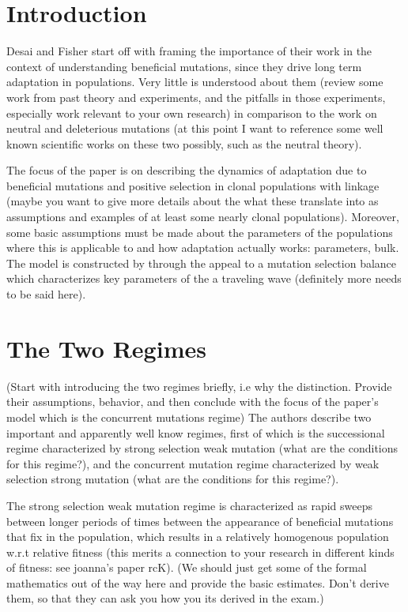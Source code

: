 \documentclass[12pt,twocolumn]{article}
\begin{document}

\newpage
\section{Introduction}
Desai and Fisher start off with framing the importance of their work in the context of understanding beneficial mutations, since they drive long term adaptation in populations.  Very little is understood about them (review some work from past theory and experiments, and the pitfalls in those experiments, especially work relevant to your own research) in comparison to the work on neutral and deleterious mutations (at this point I want to reference some well known scientific works on these two possibly, such as the neutral theory). 

The focus of the paper is on describing the dynamics of adaptation due to beneficial mutations and positive selection in clonal populations with linkage (maybe you want to give more details about the what these translate into as assumptions and examples of at least some nearly clonal populations).  Moreover, some basic assumptions must be made about the parameters of the populations where this is applicable to and how adaptation actually works: parameters, bulk.  The model is constructed by through the appeal to a mutation selection balance which characterizes key parameters of the a traveling wave (definitely more needs to be said here).  

\section{The Two Regimes}
(Start with introducing the two regimes briefly, i.e why the distinction.  Provide their assumptions, behavior, and then conclude with the focus of the paper's model which is the concurrent mutations regime) The authors describe two important and apparently well know regimes, first of which is the successional regime characterized by strong selection weak mutation (what are the conditions for this regime?), and the concurrent mutation regime characterized by weak selection strong mutation (what are the conditions for this regime?).  

The strong selection weak mutation regime is characterized as rapid sweeps between longer periods of times between the appearance of beneficial mutations that fix in the population, which results in a relatively homogenous population w.r.t relative fitness (this merits a connection to your research in different kinds of fitness: see joanna's paper rcK). (We should just get some of the formal mathematics out of the way here and provide the basic estimates.  Don't derive them, so that they can ask you how you its derived in the exam.)
\end{document}
